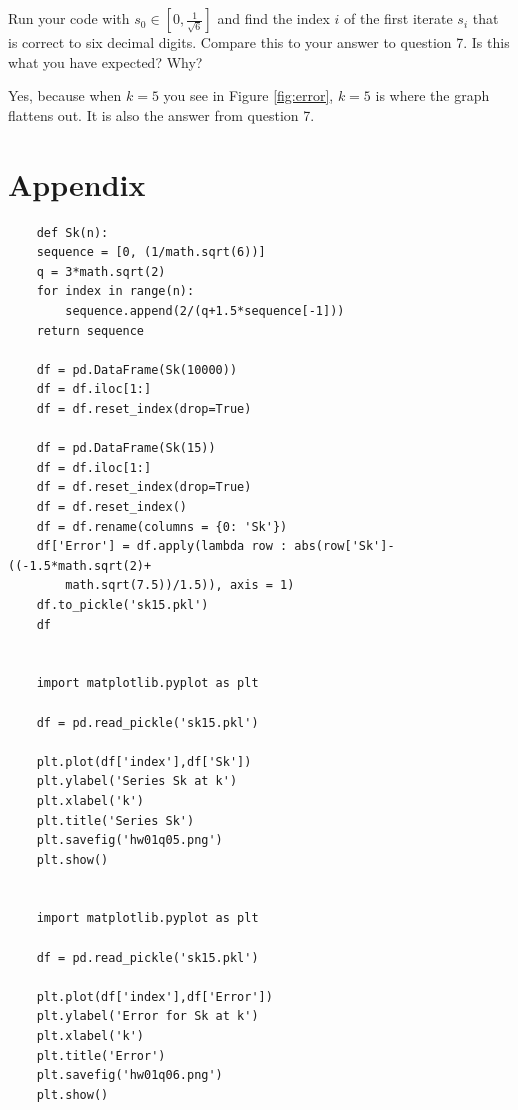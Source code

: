 \documentclass{article}
\begin{document}
\section{}
Run your code with $s_0 \in \left[0,\frac{1}{\sqrt{6}} \right]$ and find the index $i$ of the first iterate $s_i$ that is correct to six decimal digits. Compare this to your answer to question 7. Is this what you have expected? Why?
\vspace{10mm}

Yes, because when $k=5$ you see in Figure \ref{fig:error}, $k=5$ is where the graph flattens out. It is also the answer from question 7.

\section*{Appendix}

\begin{verbatim}
    def Sk(n):
    sequence = [0, (1/math.sqrt(6))]
    q = 3*math.sqrt(2)
    for index in range(n):
        sequence.append(2/(q+1.5*sequence[-1]))
    return sequence
    
    df = pd.DataFrame(Sk(10000))
    df = df.iloc[1:]
    df = df.reset_index(drop=True)
    
    df = pd.DataFrame(Sk(15))
    df = df.iloc[1:]
    df = df.reset_index(drop=True)
    df = df.reset_index()
    df = df.rename(columns = {0: 'Sk'})
    df['Error'] = df.apply(lambda row : abs(row['Sk']-((-1.5*math.sqrt(2)+
        math.sqrt(7.5))/1.5)), axis = 1) 
    df.to_pickle('sk15.pkl')
    df
    
    
    import matplotlib.pyplot as plt

    df = pd.read_pickle('sk15.pkl')

    plt.plot(df['index'],df['Sk'])
    plt.ylabel('Series Sk at k')
    plt.xlabel('k')
    plt.title('Series Sk')
    plt.savefig('hw01q05.png')
    plt.show()
    
    
    import matplotlib.pyplot as plt

    df = pd.read_pickle('sk15.pkl')

    plt.plot(df['index'],df['Error'])
    plt.ylabel('Error for Sk at k')
    plt.xlabel('k')
    plt.title('Error')
    plt.savefig('hw01q06.png')
    plt.show()
\end{verbatim}
\end{document}
